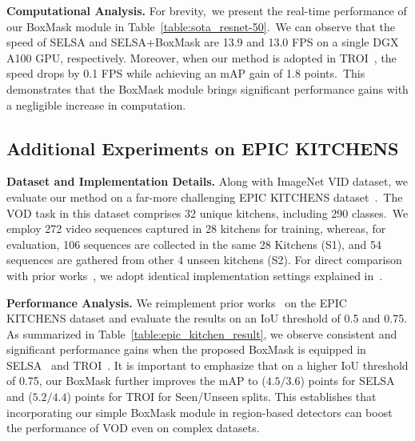 \documentclass[10pt,twocolumn,letterpaper]{article}
\begin{document}
\vspace{3pt}
\noindent \textbf{Computational Analysis.}
For brevity,~we present the real-time performance of our BoxMask module in Table~\ref{table:sota_resnet-50}.~We can observe that the speed of SELSA and SELSA+BoxMask are 13.9 and 13.0 FPS on a single DGX A100 GPU, respectively. Moreover, when our method is adopted in TROI~\cite{gong2021temporal}, the speed drops by 0.1 FPS while achieving an mAP gain of 1.8 points.~This demonstrates that the BoxMask module brings significant performance gains with a negligible increase in computation.

\subsection{Additional Experiments on EPIC KITCHENS}

\vspace{3pt}
\noindent \textbf{Dataset and Implementation Details.}
Along with ImageNet VID dataset, we evaluate our method on a far-more challenging EPIC KITCHENS dataset~\cite{damen2018scaling}.~The VOD task in this dataset comprises 32 unique kitchens, including 290 classes.~We employ 272 video sequences captured in 28 kitchens for training, whereas, for evaluation, 106 sequences are collected in the same 28 Kitchens (S1), and 54 sequences are gathered from other 4 unseen kitchens (S2). For direct comparison with prior works~\cite{gong2021temporal, wu2019sequence}, we adopt identical implementation settings explained in~\cite{wu2019sequence}.



\vspace{3pt}
\noindent \textbf{Performance Analysis.}
We reimplement prior works~\cite{wu2019sequence, gong2021temporal} on the EPIC KITCHENS dataset and evaluate the results on an IoU threshold of 0.5 and 0.75. As summarized in Table~\ref{table:epic_kitchen_result}, we observe consistent and significant performance gains when the proposed BoxMask is equipped in SELSA~\cite{wu2019sequence} and TROI~\cite{gong2021temporal}. It is important to emphasize that on a higher IoU threshold of 0.75, our BoxMask further improves the mAP to ($4.5 / 3.6$) points for SELSA and ($5.2/4.4$) points for TROI for Seen/Unseen splits. This establishes that incorporating our simple BoxMask module in region-based detectors can boost the performance of VOD even on complex datasets.
\end{document}
